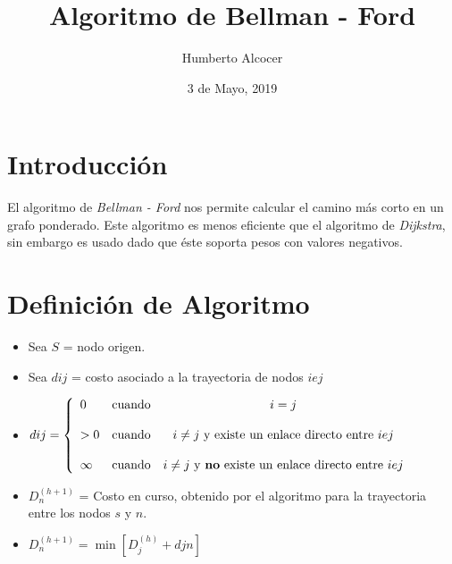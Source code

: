 \documentclass{article}
\title{Algoritmo de Bellman - Ford}
\author{Humberto Alcocer}
\date{3 de Mayo, 2019}
\begin{document}
\maketitle

\section{Introducción}

El algoritmo de \textit{Bellman - Ford} nos permite calcular el camino más
corto en un grafo ponderado. Este algoritmo es menos eficiente que el algoritmo de
\textit{Dijkstra}, sin embargo es usado dado que éste soporta pesos con valores negativos.

\section{Definición de Algoritmo}

\begin{itemize}
  \item Sea $S$ = nodo origen.
  \item Sea $dij$ = costo asociado a la trayectoria de nodos $iej$
  \item
    \begin{math}
      dij= \left\{ \begin{array}{lcc}
        0 & \textnormal{cuando} & i = j \\
        \\ > 0 & \textnormal{cuando} & i \neq j \textnormal{ y existe un enlace directo entre } iej \\
        \\ \infty & \textnormal{cuando} & i \neq j \textnormal{ y \textbf{no} existe un enlace directo entre } iej
        \end{array}
      \right.
    \end{math}
  \item $D_n^{(h+1)}$ = Costo en curso, obtenido por el algoritmo para la trayectoria entre los nodos $s$ y $n$.
  \item $D_n^{(h+1)} = \min [D_j^{(h)} + djn]$
\end{itemize}
\end{document}
